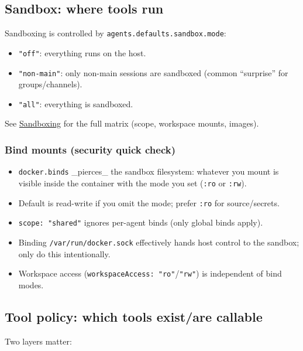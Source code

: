 \subsection{Sandbox: where tools run}


Sandboxing is controlled by \texttt{agents.defaults.sandbox.mode}:

\begin{itemize}
  \item \texttt{"off"}: everything runs on the host.
  \item \texttt{"non-main"}: only non-main sessions are sandboxed (common “surprise” for groups/channels).
  \item \texttt{"all"}: everything is sandboxed.
\end{itemize}


See \href{/gateway/sandboxing}{Sandboxing} for the full matrix (scope, workspace mounts, images).

\subsubsection{Bind mounts (security quick check)}


\begin{itemize}
  \item \texttt{docker.binds} \_pierces\_ the sandbox filesystem: whatever you mount is visible inside the container with the mode you set (\texttt{:ro} or \texttt{:rw}).
  \item Default is read-write if you omit the mode; prefer \texttt{:ro} for source/secrets.
  \item \texttt{scope: "shared"} ignores per-agent binds (only global binds apply).
  \item Binding \texttt{/var/run/docker.sock} effectively hands host control to the sandbox; only do this intentionally.
  \item Workspace access (\texttt{workspaceAccess: "ro"}/\texttt{"rw"}) is independent of bind modes.
\end{itemize}


\subsection{Tool policy: which tools exist/are callable}


Two layers matter:

